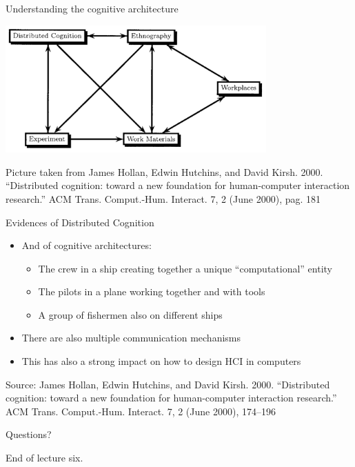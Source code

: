 \documentclass{beamer}
\begin{document}
\begin{frame}
{\centerline{Understanding the cognitive architecture}}

\begin{center}
 \includegraphics[width=10cm]{P2023.AIBCCSS.ExtendedMindDistributedCognitionSystemicThinking/networkDistributedCognition.jpg}
 
 \end{center}

\begin{center}
 \tiny{Picture taken from James Hollan, Edwin Hutchins, and David Kirsh. 2000. ``Distributed cognition: toward a new foundation for human-computer interaction research.'' ACM Trans. Comput.-Hum. Interact. 7, 2 (June 2000), pag. 181}
 \end{center}

\end{frame}


\begin{frame}
{\centerline{Evidences of Distributed Cognition}}

\begin{itemize}
\item And of cognitive architectures:
\begin{itemize}
\item The crew in a ship creating together a unique ``computational'' entity
\item The pilots in a plane working together and with tools
\item A group of fishermen also on different ships
\end{itemize}
\item There are also multiple communication mechanisms
\item This has also a strong impact on how to design HCI in computers
\end{itemize}
\begin{center}
    \tiny{Source: James Hollan, Edwin Hutchins, and David Kirsh. 2000. ``Distributed cognition: toward a new foundation for human-computer interaction research.'' ACM Trans. Comput.-Hum. Interact. 7, 2 (June 2000), 174–196}
\end{center}

\end{frame}



\begin{frame}
{\centerline{Questions?}}
\vspace{1cm}
\begin{center}
    \LARGE{End of lecture six.}
\end{center}

\end{frame}
\end{document}
